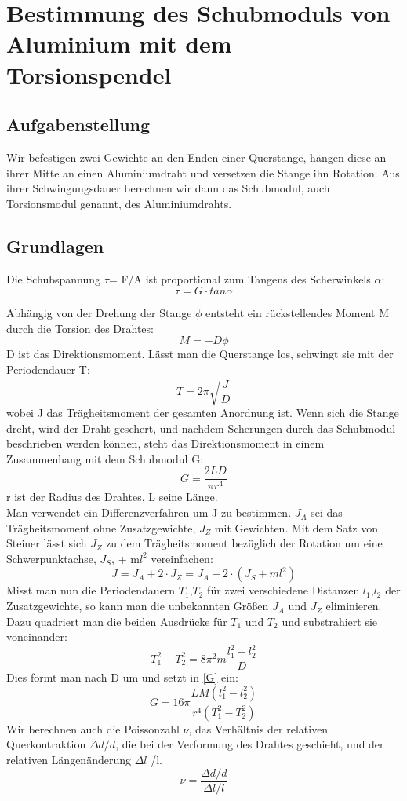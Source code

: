 \documentclass{article}
\begin{document}
\section{Bestimmung des Schubmoduls von Aluminium mit dem Torsionspendel}
\subsection{Aufgabenstellung}
Wir befestigen zwei Gewichte an den Enden einer Querstange, hängen diese an ihrer Mitte an einen Aluminiumdraht und versetzen die Stange ihn Rotation. Aus ihrer Schwingungsdauer berechnen wir dann das Schubmodul, auch Torsionsmodul genannt, des Aluminiumdrahts.
\subsection{Grundlagen}
Die Schubspannung $\tau$= F/A ist proportional zum Tangens des Scherwinkels $\alpha$:
$$ \tau = G\cdot	tan\alpha$$

Abhängig von der Drehung der Stange $\phi$ entsteht ein rückstellendes Moment M durch die Torsion des Drahtes:
$$M=-D\phi$$
D ist das Direktionsmoment. Lässt man die Querstange los, schwingt sie mit der Periodendauer T:
$$T=2\pi \sqrt{\frac{J}{D}}$$
wobei J das Trägheitsmoment der gesamten Anordnung ist. Wenn sich die Stange dreht, wird der Draht geschert, und nachdem Scherungen durch das Schubmodul beschrieben werden können, steht das Direktionsmoment in einem Zusammenhang mit dem Schubmodul G:
\begin{equation} 
\label{G}
G = \frac{2LD}{\pi r^4}
\end{equation}
r ist der Radius des Drahtes, L seine Länge. \\
Man verwendet ein Differenzverfahren um J zu bestimmen. $J_A$ sei das Trägheitsmoment ohne Zusatzgewichte, $J_Z$ mit Gewichten. Mit dem Satz von Steiner lässt sich $J_Z$ zu dem Trägheitsmoment bezüglich der Rotation um eine Schwerpunktachse, $J_S$, + m$l^2$ vereinfachen:
\begin{equation} \label{J}
J =  J_A + 2\cdot J_Z = J_A + 2 \cdot (J_S + ml^2)
\end{equation} 
Misst man nun die Periodendauern $T_1$,$T_2$ für zwei verschiedene Distanzen $l_1$,$l_2$ der Zusatzgewichte, so kann man die unbekannten Größen $J_A$ und $J_Z$ eliminieren. Dazu quadriert man die beiden Ausdrücke für $T_1$ und $T_2$ und substrahiert sie voneinander: 
$$T_1^2-T_2^2 = 8 \pi^2m\frac{l_1^2-l_2^2}{D}$$
Dies formt man nach D um und setzt in  \ref{G} ein:
\begin{equation}
\label{Gfinal}
G=16\pi\frac{LM(l_1^2-l_2^2)}{r^4(T_1^2-T_2^2)}
\end{equation} 
Wir berechnen auch die Poissonzahl $\nu$, das Verhältnis der relativen Querkontraktion $\Delta d / d$, die bei der Verformung des Drahtes geschieht, und der relativen Längenänderung $\Delta l$ /l.
$$\nu=\frac{\Delta d / d}{\Delta l / l} $$
\end{document}
